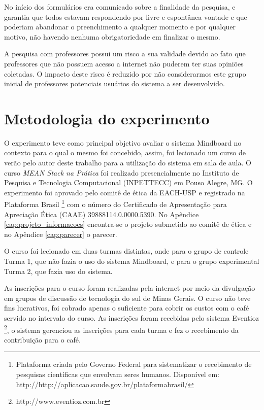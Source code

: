No início dos formulários era comunicado sobre a finalidade da pesquisa, e  garantia que todos estavam respondendo por livre e espontânea vontade e que poderiam abandonar o preenchimento a qualquer momento e por qualquer motivo, não havendo nenhuma obrigatoriedade em finalizar o mesmo.

A pesquisa com professores possui um risco a sua validade devido ao fato que professores que não possuem acesso a internet não puderem ter suas opiniões coletadas. O impacto deste risco é reduzido por não considerarmos este grupo inicial de professores potenciais usuários do sistema a ser desenvolvido.



\section{Metodologia do experimento}
\label{sec:metodologia_experimento}

O experimento teve como principal objetivo avaliar o sistema Mindboard no contexto para o qual o mesmo foi concebido, assim, foi lecionado um curso de verão pelo autor deste trabalho para a utilização do sistema em sala de aula. O curso \emph{MEAN Stack na Prática} foi realizado presencialmente no Instituto de Pesquisa e Tecnologia Computacional (INPETTECC) em Pouso Alegre, MG. O experimento foi aprovado pelo comitê de ética da EACH-USP e registrado na Plataforma Brasil \footnote{Plataforma criada pelo Governo Federal para sistematizar o recebimento de pesquisas científicas que envolvam seres humanos. Disponível em: http://http://aplicacao.saude.gov.br/plataformabrasil/} com o número do Certificado de Apresentação para Apreciação Ética (CAAE) 39888114.0.0000.5390. No Apêndice \ref{cap:projeto_informacoes} encontra-se o projeto submetido ao comitê de ética e no Apêndice \ref{cap:parecer} o parecer.

O curso foi lecionado em duas turmas distintas, onde para o grupo de controle Turma 1, que não fazia o uso do sistema Mindboard, e para o grupo experimental Turma 2, que fazia uso do sistema.

As inscrições para o curso foram realizadas pela internet por meio da divulgação em grupos de discussão de tecnologia do sul de Minas Gerais. O curso não teve fins lucrativos, foi cobrado apenas o suficiente para cobrir os custos com o café servido no intervalo do curso. As inscrições foram recebidas pelo sistema Eventioz \footnote{http://www.eventioz.com.br}, o sistema gerenciou as inscrições para cada turma e fez o recebimento da contribuição para o café.

